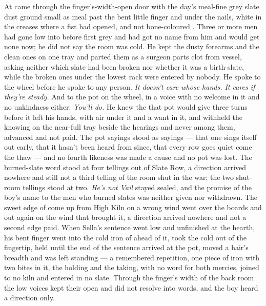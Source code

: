 At   came through the finger's-width-open door with the day's meal-fine grey slate dust ground small as meal past the bent little finger and under the nails, white in the creases where a fist had opened, and not bone-coloured . Three or more men had gone low into  before first grey and had got no name from him and would get none now; he did not say the room was cold. He kept the dusty forearms and the clean ones on one tray and parted them as a surgeon parts clot from vessel, asking neither which slate had been broken nor whether it was a birth-slate, while the broken ones under the lowest rack were entered by nobody. He spoke to the wheel before he spoke to any person. \emph{It doesn't care whose hands. It cares if they're steady.} And to the pot on the wheel, in a voice with no welcome in it and no unkindness either: \emph{You'll do.} He knew the  that pot would give three turns before it left his hands, with air under it and a want in it, and withheld the knowing on the near-full tray beside the hearings and never among them, advanced and not paid. The pot sayings stood as sayings — that one sings itself out early, that it hasn't been heard from since, that every row goes quiet come the thaw — and no fourth likeness was made a cause and no pot was lost. The burned-slate word stood at four tellings out of Slate Row, a direction arrived nowhere and still not a third telling of the room shut in the war; the two shut-room tellings stood at two. \emph{He's not Vail} stayed sealed, and the promise of the boy's name to the men who burned slates was neither given nor withdrawn. The sweet edge of  come up from High Kiln on a wrong wind went over the boards and out again on the wind that brought it, a direction arrived nowhere and not a second edge paid. When Sella's sentence went low and unfinished at the hearth, his bent finger went into the cold iron of  ahead of it, took the cold out of the fingertip, held until the end of the sentence arrived at the pot, moved a hair's breadth and was left standing — a remembered repetition, one piece of iron with two bites in it, the holding and the taking, with no  word for both mercies, joined to no kiln and entered in no slate. Through the finger's width of the back room the low voices kept their open and did not resolve into words, and the boy heard a direction only.

